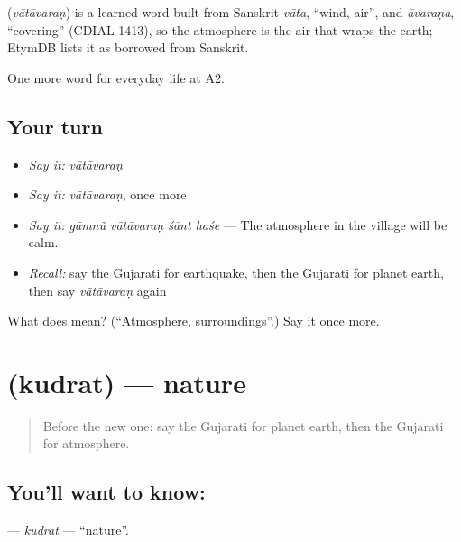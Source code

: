 \begin{cousinweb}
\textbf{} (\emph{vātāvaraṇ}) is a learned word built from Sanskrit \emph{vāta}, \textquotedblleft{}wind, air\textquotedblright{}, and \emph{āvaraṇa}, \textquotedblleft{}covering\textquotedblright{} (CDIAL 1413), so the atmosphere is the air that wraps the earth; EtymDB lists it as borrowed from Sanskrit.
\end{cousinweb}

\begin{grammarlens}[title={What you've built}]
One more word for everyday life at A2.
\end{grammarlens}

\subsection*{Your turn}
\begin{itemize}
\raggedright
  \item \emph{Say it:} \emph{vātāvaraṇ}
  \item \emph{Say it:} \emph{vātāvaraṇ}, once more
  \item \emph{Say it:} \emph{gāmnũ vātāvaraṇ śānt haśe} — The atmosphere in the village will be calm.
  \item \emph{Recall:} say the Gujarati for earthquake, then the Gujarati for planet earth, then say \emph{vātāvaraṇ} again
\end{itemize}

\begin{tcolorbox}[breakable,colback=teal!4,colframe=teal!35!black,title={Before you move on}]
What does  mean? (\textquotedblleft{}Atmosphere, surroundings\textquotedblright{}.) Say it once more.
\end{tcolorbox}
\section[\texorpdfstring{\gu{કુદરત} (kudrat)}{કુદરત (kudrat)}]{ (kudrat) — nature}

\label{lesson:GU-C222-kudrat}



\begin{quote}
Before the new one: say the Gujarati for planet earth, then the Gujarati for atmosphere.
\end{quote}

\subsection*{You'll want to know: }
\textbf{} — \emph{kudrat} — \textquotedblleft{}nature\textquotedblright{}.

